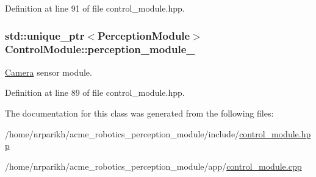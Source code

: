 Definition at line 91 of file control\+\_\+module.\+hpp.

\subsubsection[{\texorpdfstring{perception\+\_\+module\+\_\+}{perception_module_}}]{\setlength{\rightskip}{0pt plus 5cm}std\+::unique\+\_\+ptr$<${\bf Perception\+Module}$>$ Control\+Module\+::perception\+\_\+module\+\_\+\hspace{0.3cm}{\ttfamily [private]}}\hypertarget{class_control_module_a179995b24b2400b72b2cfd079b576782}{}\label{class_control_module_a179995b24b2400b72b2cfd079b576782}


\hyperlink{class_camera}{Camera} sensor module. 



Definition at line 89 of file control\+\_\+module.\+hpp.



The documentation for this class was generated from the following files\+:\begin{DoxyCompactItemize}
\item 
/home/nrparikh/acme\+\_\+robotics\+\_\+perception\+\_\+module/include/\hyperlink{control__module_8hpp}{control\+\_\+module.\+hpp}\item 
/home/nrparikh/acme\+\_\+robotics\+\_\+perception\+\_\+module/app/\hyperlink{control__module_8cpp}{control\+\_\+module.\+cpp}\end{DoxyCompactItemize}
